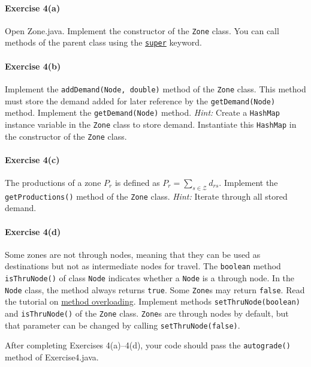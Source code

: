 \documentclass[12pt]{article}
\newcommand{\Z}{\mathcal{Z}}
\begin{document}
	
\paragraph*{Exercise 4(a)} Open Zone.java. Implement the constructor of the \texttt{Zone} class. You can call methods of the parent class using the \href{https://www.w3schools.com/java/ref_keyword_super.asp}{\texttt{super}} keyword.

\paragraph*{Exercise 4(b)} Implement the \texttt{addDemand(Node, double)} method of the \texttt{Zone} class. This method must store the demand added for later reference by the \texttt{getDemand(Node)} method. Implement the \texttt{getDemand(Node)} method. \textit{Hint: } Create a \texttt{HashMap} instance variable in the \texttt{Zone} class to store demand. Instantiate this \texttt{HashMap} in the constructor of the \texttt{Zone} class. 

\paragraph*{Exercise 4(c)} The productions of a zone $P_r$ is defined as $P_r=\sum\limits_{s\in\Z}d_{rs}$. Implement the \texttt{getProductions()} method of the \texttt{Zone} class. \textit{Hint:} Iterate through all stored demand.


\paragraph*{Exercise 4(d)} Some zones are not through nodes, meaning that they can be used as destinations but not as intermediate nodes for travel. The \texttt{boolean} method \texttt{isThruNode()} of class \texttt{Node} indicates whether a \texttt{Node} is a through node. In the \texttt{Node} class, the method always returns \texttt{true}. Some \texttt{Zone}s may return \texttt{false}. Read the tutorial on \href{https://www.w3schools.com/java/java_methods_overloading.asp}{method overloading}. Implement methods \texttt{setThruNode(boolean)} and \texttt{isThruNode()} of the \texttt{Zone} class. \texttt{Zone}s are through nodes by default, but that parameter can be changed by calling \texttt{setThruNode(false)}.



 \vspace{\baselineskip}

\noindent
After completing Exercises 4(a)--4(d), your code should pass the \texttt{autograde()} method of Exercise4.java. 
\end{document}
